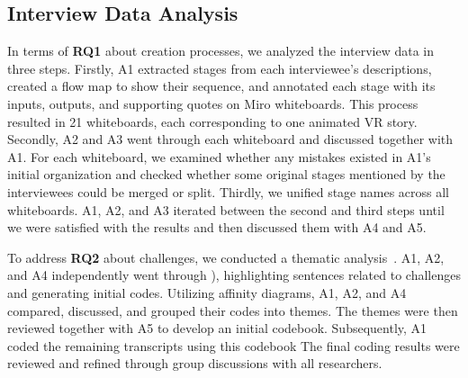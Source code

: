 \subsection{Interview Data Analysis}
In terms of \textbf{RQ1} about creation processes, we analyzed the interview data in three steps. 
Firstly, A1 extracted stages from each interviewee's descriptions, created a flow map to show their sequence, and annotated each stage with its inputs, outputs, and supporting quotes on Miro whiteboards. This process resulted in 21 whiteboards, each corresponding to one animated VR story. 
Secondly, A2 and A3 went through each whiteboard and discussed together with A1. For each whiteboard, we examined whether any mistakes existed in A1's initial organization and checked whether some original stages mentioned by the interviewees could be merged or split. 
Thirdly, we unified stage names across all whiteboards. 
A1, A2, and A3 iterated between the second and third steps until we were satisfied with the results and then discussed them with A4 and A5.

To address \textbf{RQ2} about challenges, we conducted a thematic analysis~\cite{braun2019reflecting}. A1, A2, and A4 independently went through ), highlighting sentences related to challenges and generating initial codes. Utilizing affinity diagrams, A1, A2, and A4 compared, discussed, and grouped their codes into themes. The themes were then reviewed together with A5 to develop an initial codebook. Subsequently, A1 coded the remaining transcripts using this codebook 
The final coding results were reviewed and refined through group discussions with all researchers.
